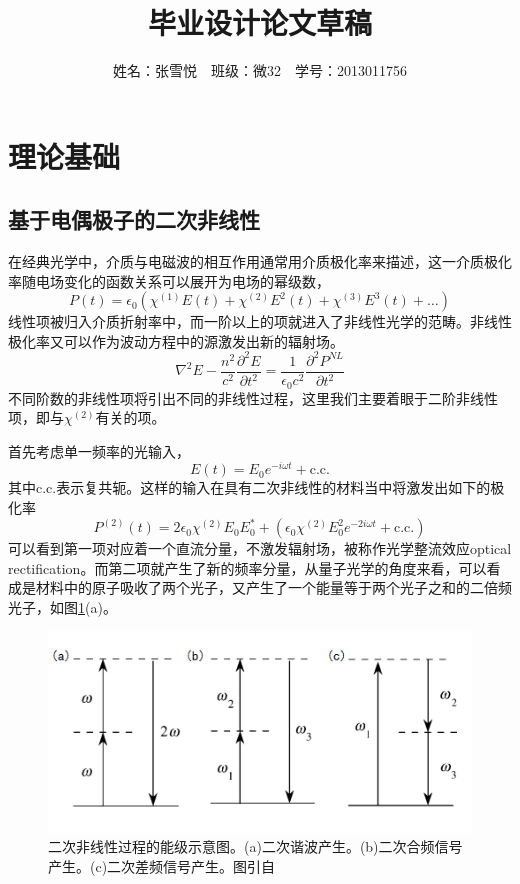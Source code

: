 \documentclass[UTF8,a4paper,cs4size,hyperref]{ctexart}
\title{毕业设计论文草稿}
\author{姓名：张雪悦\ \ 班级：微32\ \ 学号：2013011756}
\begin{document}
\maketitle

\section{理论基础}
\subsection{基于电偶极子的二次非线性}
\label{sec:dipole}
在经典光学中，介质与电磁波的相互作用通常用介质极化率来描述，这一介质极化率随电场变化的函数关系可以展开为电场的幂级数，
\begin{equation}
P(t) = \epsilon_0(\chi^{(1)}E(t)+\chi^{(2)}E^2(t)+\chi^{(3)}E^3(t)+\dots)
\end{equation}
线性项被归入介质折射率中，而一阶以上的项就进入了非线性光学的范畴。非线性极化率又可以作为波动方程中的源激发出新的辐射场。
\begin{equation}
\nabla^2E-\frac{n^2}{c^2}\frac{\partial^2E}{\partial t^2} = \frac{1}{\epsilon_0c^2}\frac{\partial^2P^{NL}}{\partial t^2}
\label{eq:wave}
\end{equation}
不同阶数的非线性项将引出不同的非线性过程，这里我们主要着眼于二阶非线性项，即与$\chi^{(2)}$有关的项。

首先考虑单一频率的光输入，
\begin{equation}
E(t) = E_0e^{-i\omega t}+\textrm{c.c.} 
\end{equation}
	其中c.c.表示复共轭。这样的输入在具有二次非线性的材料当中将激发出如下的极化率
\begin{equation}
P^{(2)}(t) = 2\epsilon_0\chi^{(2)}E_0E_0^*+(\epsilon_0\chi^{(2)}E_0^2e^{-2i\omega t}+\textrm{c.c.})
\end{equation}
可以看到第一项对应着一个直流分量，不激发辐射场，被称作光学整流效应optical rectification。而第二项就产生了新的频率分量，从量子光学的角度来看，可以看成是材料中的原子吸收了两个光子，又产生了一个能量等于两个光子之和的二倍频光子，如图\ref{pic:energyLevel}(a)。

\begin{figure}
\centering
\includegraphics[scale=0.8 ]{energyLevel.png}
\caption{二次非线性过程的能级示意图。(a)二次谐波产生。(b)二次合频信号产生。(c)二次差频信号产生。图引自\cite{boyd2003nonlinear}}
\label{pic:energyLevel}
\end{figure}
\end{document}
